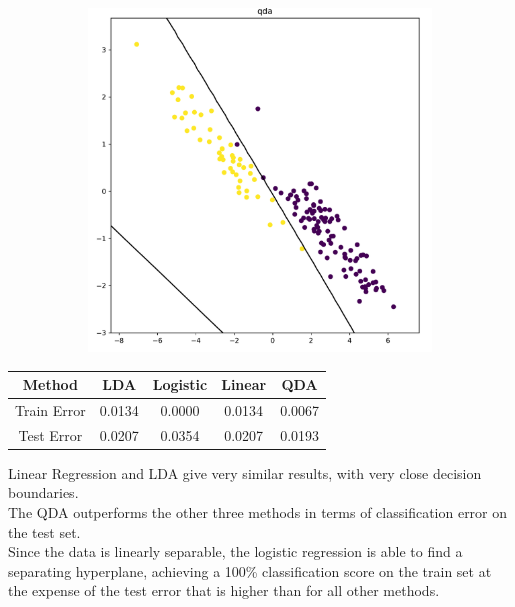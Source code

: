 \documentclass[9pt, oneside]{amsart}   	%
\begin{document}
\begin{figure}[t!]
\begin{subfigure}{.45\textwidth}
\end{subfigure} \hspace{5pt}
\begin{subfigure}{.45\textwidth}
  \centering
  \includegraphics[width=\linewidth]{classificationA_qda.pdf}
\end{subfigure}
\end{figure}

\hfill
 \begin{minipage}{.45\textwidth}
  \begin{table}[H]
   \centering
    \begin{tabular}{c|cccc}
    Method & LDA & Logistic & Linear & QDA \\
    \hline
    Train Error & 0.0134 & 0.0000 & 0.0134 & 0.0067 \\
    \hline
    Test Error & 0.0207 & 0.0354 & 0.0207 & 0.0193 \\
    \end{tabular}
\end{table}

 \end{minipage}\hfill
 \begin{minipage}{.45\textwidth}
	Linear Regression and LDA give very similar results, with very close decision boundaries.\\
	The QDA outperforms the other three methods in terms of classification error on the test set.\\
	Since the data is linearly separable, the logistic regression is able to find a separating hyperplane, achieving a 100\% classification score on the train set at the expense of the test error that is higher than for all other methods.
 \end{minipage}\hspace{1cm}
\end{document}
